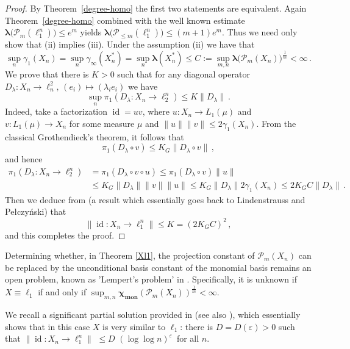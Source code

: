 \documentclass[12pt]{amsart}
\numberwithin{subsection}{section}
\theoremstyle{definition}
\theoremstyle{remark}
\DeclareMathOperator{\mon}{mon}
\DeclareMathOperator{\id}{\mathrm{id}}
\newcommand{\chimon}{\chi_{\mon}}
\begin{document}
\begin{proof}
By Theorem~\ref{degree-homo} the first two statements are equivalent. Again Theorem~\ref{degree-homo} combined with
the well known estimate $\boldsymbol{\lambda}\big(\mathcal{P}_{ m}(\ell_1^n)\big) \leq  e^m$ yields
$\boldsymbol{\lambda}\big(\mathcal{P}_{ \leq m}(\ell_1^n)\big) \leq  (m+1) e^{m}$. Thus we need only show that (ii)
implies (iii). Under the assumption (ii) we have that
\[
\sup_{n} \gamma_1(X_n)  = \sup_{n} \gamma_\infty(X_n^\ast) =\sup_{n} \boldsymbol{\lambda}(X_n^\ast) \leq C:= \sup_{m,n} \boldsymbol{\lambda}\big(\mathcal{P}_{  m}(X_n)\big)^\frac{1}{m} < \infty\,.
\]
We prove that there is $K >0$ such that for any diagonal operator $D_\lambda: X_n  \to \ell_n^2, \,(e_i) \mapsto (\lambda_i e_i)$
we have
\[
\sup_n \pi_1(D_\lambda\colon X_n\to \ell^n_2) \leq  K \|D_\lambda\|\,.
\]
Indeed, take a factorization $\id = uv$, where $u\colon X_n \to L_1(\mu)$ and $v\colon  L_1(\mu) \to X_n $ for some measure $\mu$
and  $\|u\| \|v\| \leq  2  \gamma_1(X_n)$. From the classical Grothendieck's theorem, it follows that
\[
\pi_1 (D_\lambda \circ v) \leq K_G  \|D_\lambda \circ v\|\,,
\]
and hence
\begin{align*}
\pi_1(D_\lambda\colon X_n\to \ell^n_2) & =  \pi_1(D_\lambda\circ v \circ u)
\leq \pi_1(D_\lambda\circ v) \|u\| \\
& \leq K_G  \|D_\lambda\| \|v\| \|u\|\leq  K_G  \|D_\lambda\| 2  \gamma_1(X_n) \leq  2 K_G C  \|D_\lambda\|\,.
\end{align*}
Then we deduce from \cite[Proposition 33.6]{tomczak1989banach} (a result which essentially goes  back to Lindenstrauss and
Pe{\l}czy\'nski) that
\[
\|\id\colon  X_n \to \ell_1^n \| \leq K=(2 K_G C)^2\,,
\]
and this completes the proof.
\end{proof}

Determining whether, in Theorem \ref{Xl1}, the projection constant of $\mathcal{P}_{m}(X_n)$ can be replaced by the unconditional
basis constant of the monomial basis remains an open problem, known as 'Lempert's problem' in \cite{defant2019libro}. Specifically,
it is unknown if $X \equiv \ell_1$ if and only if $\sup_{m,n} \boldsymbol{\chimon}\left(\mathcal{P}_{  m}(X_n)\right)^{\frac{1}{m}}< \infty$.

We recall a significant partial solution provided in \cite{bayart2012maximum} (see also \cite[Theorem 20.26]{defant2019libro}),
which essentially shows that in this case $X$ is very similar to $\ell_1$: there is $D=D(\varepsilon) >0$ such that
$\|\id\colon X_n \to \ell_1^n \| \,\,\leq D \,\,(\log \log n)^\varepsilon\,$ for all $n$.
\end{document}
